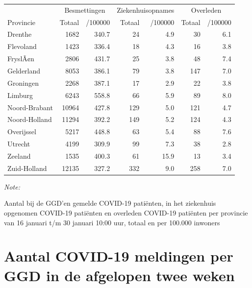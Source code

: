 \documentclass[
  english,
  man,floatsintext]{apa6}
\begin{document}
\begin{table}[H]
\centering
\begin{threeparttable}
\begin{tabular}{lrrrrrr}
\toprule
\multicolumn{1}{c}{ } & \multicolumn{2}{c}{Besmettingen} & \multicolumn{2}{c}{Ziekenhuisopnames} & \multicolumn{2}{c}{Overleden} \\
\cmidrule(l{3pt}r{3pt}){2-3} \cmidrule(l{3pt}r{3pt}){4-5} \cmidrule(l{3pt}r{3pt}){6-7}
Provincie & Totaal & /100000 & Totaal & /100000 & Totaal & /100000\\
\midrule
Drenthe & 1682 & 340.7 & 24 & 4.9 & 30 & 6.1\\
Flevoland & 1423 & 336.4 & 18 & 4.3 & 16 & 3.8\\
FryslÃ¢n & 2806 & 431.7 & 25 & 3.8 & 48 & 7.4\\
Gelderland & 8053 & 386.1 & 79 & 3.8 & 147 & 7.0\\
Groningen & 2268 & 387.1 & 17 & 2.9 & 22 & 3.8\\
Limburg & 6243 & 558.8 & 66 & 5.9 & 89 & 8.0\\
Noord-Brabant & 10964 & 427.8 & 129 & 5.0 & 121 & 4.7\\
Noord-Holland & 11294 & 392.2 & 149 & 5.2 & 124 & 4.3\\
Overijssel & 5217 & 448.8 & 63 & 5.4 & 88 & 7.6\\
Utrecht & 4199 & 309.9 & 99 & 7.3 & 38 & 2.8\\
Zeeland & 1535 & 400.3 & 61 & 15.9 & 13 & 3.4\\
Zuid-Holland & 12135 & 327.2 & 332 & 9.0 & 258 & 7.0\\
\bottomrule
\end{tabular}
\begin{tablenotes}
\item \textit{Note: } 
\item Aantal bij de GGD’en gemelde COVID-19 patiënten, in het ziekenhuis opgenomen COVID-19 patiënten en overleden COVID-19 patiënten per provincie van 16 januari t/m 30 januari 10:00 uur, totaal en per 100.000 inwoners
\end{tablenotes}
\end{threeparttable}
\end{table}

\newpage

\hypertarget{aantal-covid-19-meldingen-per-ggd-in-de-afgelopen-twee-weken}{%
\section{Aantal COVID-19 meldingen per GGD in de afgelopen twee weken}\label{aantal-covid-19-meldingen-per-ggd-in-de-afgelopen-twee-weken}}
\end{document}
